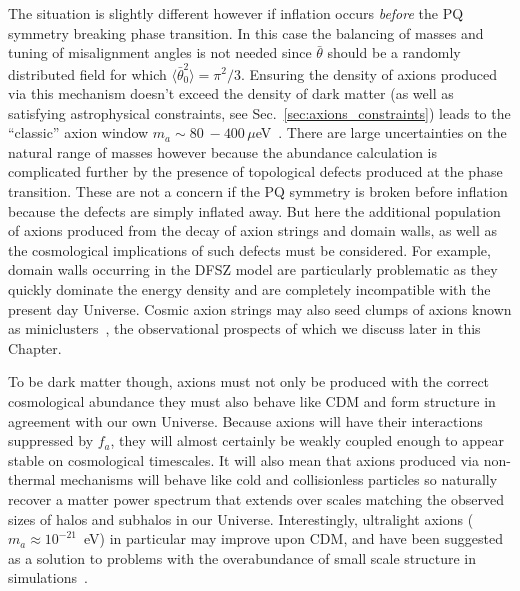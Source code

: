 The situation is slightly different however if inflation occurs {\it before} the PQ symmetry breaking phase transition. In this case the balancing of masses and tuning of misalignment angles is not needed since $\bar{\theta}$ should be a randomly distributed field for which $\langle \bar{\theta}_0^2\rangle = \pi^2/3$. Ensuring the density of axions produced via this mechanism doesn't exceed the density of dark matter (as well as satisfying astrophysical constraints, see Sec.~\ref{sec:axions_constraints}) leads to the ``classic'' axion window $m_a \sim 80~-400\,\mu$eV~\cite{Hiramatsu:2012gg}. There are large uncertainties on the natural range of masses however because the abundance calculation is complicated further by the presence of topological defects produced at the phase transition. These are not a concern if the PQ symmetry is broken before inflation because the defects are simply inflated away. But here the additional population of axions produced from the decay of axion strings and domain walls, as well as the cosmological implications of such defects must be considered. For example, domain walls occurring in the DFSZ model are particularly problematic as they quickly dominate the energy density and are completely incompatible with the present day Universe. Cosmic axion strings may also seed clumps of axions known as miniclusters~\cite{Hogan:1988mp,Kolb:1993zz,Kolb:1993hw,Kolb:1994fi,Kolb:1995bu,Berezinsky:2013fxa,Tinyakov:2015cgg,Fairbairn:2017dmf}, the observational prospects of which we discuss later in this Chapter.

To be dark matter though, axions must not only be produced with the correct cosmological abundance they must also behave like CDM and form structure in agreement with our own Universe. Because axions will have their interactions suppressed by $f_a$, they will almost certainly be weakly coupled enough to appear stable on cosmological timescales. It will also mean that axions produced via non-thermal mechanisms will behave like cold and collisionless particles so naturally recover a matter power spectrum that extends over scales matching the observed sizes of halos and subhalos in our Universe. Interestingly, ultralight axions ($m_a \approx 10^{-21}$~eV) in particular may improve upon CDM, and have been suggested as a solution to problems with the overabundance of small scale structure in simulations~\cite{Marsh:2015wka,Hu:2000ke,Marsh:2013ywa}.

